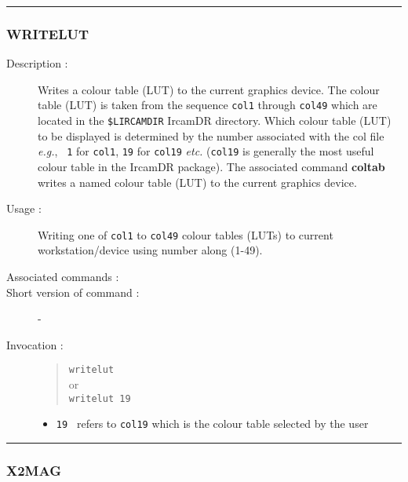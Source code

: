 \hrule 
\subsubsection*{\label{WRITELUT}WRITELUT}

\begin{description}

\item[Description :] Writes a colour table (LUT) to the current graphics
device. The colour table (LUT) is taken from the sequence {\tt col1}
through {\tt col49} which are located in the {\tt \$LIRCAMDIR} {\sc
IrcamDR} directory.  Which colour table (LUT) to be displayed is
determined by the number associated with the col file \emph{e.g.}, {\tt
1} for {\tt col1}, {\tt 19} for {\tt col19} \emph{etc.} ({\tt col19} is
generally the most useful colour table in the {\sc IrcamDR} package).
The associated command {\bf coltab} writes a named colour table (LUT)
to the current graphics device.

\item[Usage :] Writing one of {\tt col1} to {\tt col49} colour tables 
(LUTs) to current workstation/device using number along (1-49).
\item[Associated commands :] {\tt {}}
\item[Short version of command :] -
\item[Invocation :]

\begin{quote}{\tt  writelut }\\
or \\
{\tt writelut 19 }
\end{quote}

\begin{itemize}

\item {\tt 19 } refers to {\tt col19} which  is the colour table selected by
 the user
\end{itemize}

\end{description}

\hrule 
\subsubsection*{\label{X2MAG}X2MAG}

